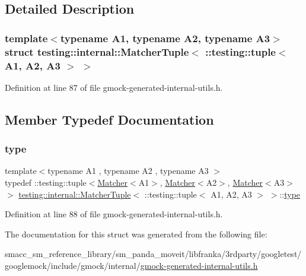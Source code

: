 \subsection{Detailed Description}
\subsubsection*{template$<$typename A1, typename A2, typename A3$>$\newline
struct testing\+::internal\+::\+Matcher\+Tuple$<$ \+::testing\+::tuple$<$ A1, A2, A3 $>$ $>$}



Definition at line 87 of file gmock-\/generated-\/internal-\/utils.\+h.



\subsection{Member Typedef Documentation}
\mbox{\label{structtesting_1_1internal_1_1MatcherTuple_3_01_1_1testing_1_1tuple_3_01A1_00_01A2_00_01A3_01_4_01_4_a14ce558da46f2d3829b2dfacdab2c980}} 
\subsubsection{\texorpdfstring{type}{type}}
{\footnotesize\ttfamily template$<$typename A1 , typename A2 , typename A3 $>$ \\
typedef \+::testing\+::tuple$<$\hyperlink{classtesting_1_1Matcher}{Matcher}$<$A1$>$, \hyperlink{classtesting_1_1Matcher}{Matcher}$<$A2$>$, \hyperlink{classtesting_1_1Matcher}{Matcher}$<$A3$>$ $>$ \hyperlink{structtesting_1_1internal_1_1MatcherTuple}{testing\+::internal\+::\+Matcher\+Tuple}$<$ \+::testing\+::tuple$<$ A1, A2, A3 $>$ $>$\+::\hyperlink{structtesting_1_1internal_1_1MatcherTuple_3_01_1_1testing_1_1tuple_3_01A1_00_01A2_00_01A3_01_4_01_4_a14ce558da46f2d3829b2dfacdab2c980}{type}}



Definition at line 88 of file gmock-\/generated-\/internal-\/utils.\+h.



The documentation for this struct was generated from the following file\+:\begin{DoxyCompactItemize}
\item 
smacc\+\_\+sm\+\_\+reference\+\_\+library/sm\+\_\+panda\+\_\+moveit/libfranka/3rdparty/googletest/googlemock/include/gmock/internal/\hyperlink{gmock-generated-internal-utils_8h}{gmock-\/generated-\/internal-\/utils.\+h}\end{DoxyCompactItemize}
